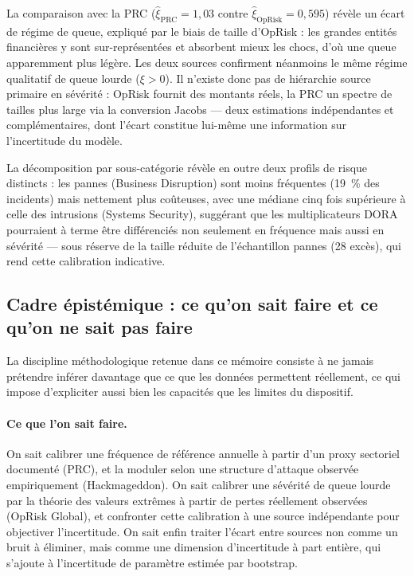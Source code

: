 \documentclass[11pt,a4paper]{article}
\theoremstyle{navystyle}
\theoremstyle{navydef}
\begin{document}
La comparaison avec la PRC ($\hat{\xi}_{\text{PRC}} = 1{,}03$ contre
$\hat{\xi}_{\text{OpRisk}} = 0{,}595$) révèle un écart de régime de queue,
expliqué par le biais de taille d'OpRisk : les grandes entités financières y
sont sur-représentées et absorbent mieux les chocs, d'où une queue
apparemment plus légère. Les deux sources confirment néanmoins le même régime
qualitatif de queue lourde ($\xi > 0$). Il n'existe donc pas de hiérarchie
\og source primaire\fg{} en sévérité : OpRisk fournit des montants réels, la PRC
un spectre de tailles plus large via la conversion Jacobs --- deux
estimations indépendantes et complémentaires, dont l'écart constitue
lui-même une information sur l'incertitude du modèle.

La décomposition par sous-catégorie révèle en outre deux profils de risque
distincts : les pannes (\og Business Disruption\fg{}) sont moins fréquentes
(19~\% des incidents) mais nettement plus coûteuses, avec une médiane cinq
fois supérieure à celle des intrusions (\og Systems Security\fg{}), suggérant que
les multiplicateurs DORA pourraient à terme être différenciés non seulement
en fréquence mais aussi en sévérité --- sous réserve de la taille réduite de
l'échantillon \og pannes\fg{} (28 excès), qui rend cette calibration indicative.

\subsection{Cadre épistémique : ce qu'on sait faire et ce qu'on ne sait pas faire}

La discipline méthodologique retenue dans ce mémoire consiste à ne jamais
prétendre inférer davantage que ce que les données permettent réellement, ce
qui impose d'expliciter aussi bien les capacités que les limites du dispositif.

\paragraph{Ce que l'on sait faire.} On sait calibrer une fréquence de
référence annuelle à partir d'un proxy sectoriel documenté (PRC), et la
moduler selon une structure d'attaque observée empiriquement (Hackmageddon).
On sait calibrer une sévérité de queue lourde par la théorie des valeurs
extrêmes à partir de pertes réellement observées (OpRisk Global), et
confronter cette calibration à une source indépendante pour objectiver
l'incertitude. On sait enfin traiter l'écart entre sources non comme un bruit
à éliminer, mais comme une dimension d'incertitude à part entière, qui
s'ajoute à l'incertitude de paramètre estimée par bootstrap.
\end{document}
